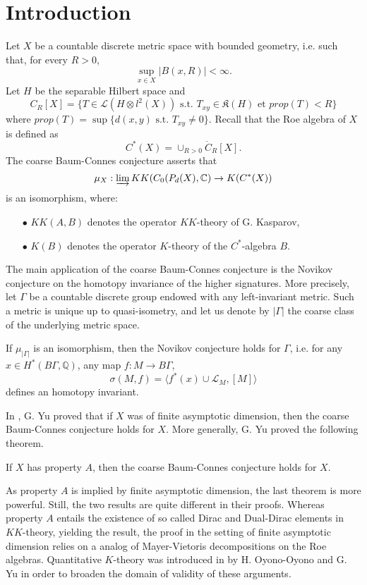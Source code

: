 \section{Introduction}

Let $X$ be a countable discrete metric space with bounded geometry, i.e. such that, for every $R>0$, 
\[\sup_{x\in X} |B(x,R)|<\infty.\] 
Let $H$ be the separable Hilbert space and 
\[C_R[X] = \{T\in \mathcal L(H\otimes l^2(X)) \text{ s.t. } T_{xy} \in \mathfrak K(H) \text{ et } prop(T) < R \}\]
where $prop(T) = \sup\{d(x,y) \text{ s.t. } T_{xy} \neq 0\}$. Recall that the Roe algebra of $X$ is defined as
\[C^*(X) = \overline{\cup_{R>0} C_R[X]}.\] 
The coarse Baum-Connes conjecture asserts that
\[\mu_X : \varinjlim KK(C_0(P_d(X),\mathbb C) \rightarrow K(C^*(X))\]
is an isomorphism, where:
\begin{itemize}
\item[$\bullet$] $KK(A,B)$ denotes the operator $KK$-theory of G. Kasparov,
\item[$\bullet$] $K(B)$ denotes the operator $K$-theory of the $C^*$-algebra $B$.
\end{itemize}

The main application of the coarse Baum-Connes conjecture is the Novikov conjecture on the homotopy invariance of the higher signatures. More precisely, let $\Gamma$ be a countable discrete group endowed with any left-invariant metric. Such a metric is unique up to quasi-isometry, and let us denote by $|\Gamma|$ the coarse class of the underlying metric space. 

\begin{thm}
If $\mu_{|\Gamma|}$ is an isomorphism, then the Novikov conjecture holds for $\Gamma$, i.e. for any $x\in H^*(B\Gamma,\mathbb Q)$, any map $f:M\rightarrow B  \Gamma $,
\[ \sigma(M,f) = \langle f^*(x)\cup \mathcal L_M,[M]\rangle\]
defines an homotopy invariant.
\end{thm}  

In \cite{Yu1}, G. Yu proved that if $X$ was of finite asymptotic dimension, then the coarse Baum-Connes conjecture holds for $X$. More generally, G. Yu proved the following theorem.

\begin{thm}[\cite{Yu2}]
If $X$ has property $A$, then the coarse Baum-Connes conjecture holds for $X$.
\end{thm}

As property $A$ is implied by finite asymptotic dimension, the last theorem is more powerful. Still, the two results are quite different in their proofs. Whereas property $A$ entails the existence of so called Dirac and Dual-Dirac elements in $KK$-theory, yielding the result, the proof in the setting of finite asymptotic dimension relies on a analog of Mayer-Vietoris decompositions on the Roe algebras. Quantitative $K$-theory was introduced in \cite{OY2} by H. Oyono-Oyono and G. Yu in order to broaden the domain of validity of these arguments.\\ 


